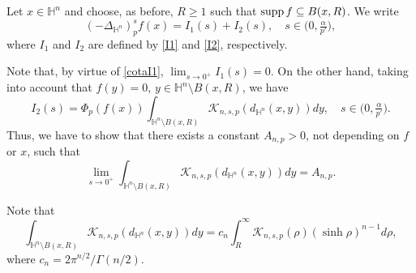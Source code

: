 \documentclass[a4paper,10pt, reqno]{amsart}
\theoremstyle{definition}
\theoremstyle{remark}
\numberwithin{equation}{section}
\begin{document}
{Let $x\in \mathbb H^n$ and choose, as before, $R\geq 1$ such that ${\rm supp }\,f\subseteq B(x,R)$. We write 
$$
(-\Delta_{\mathbb H^n})_p^sf(x)=I_1(s)+I_2(s), \quad s\in \big(0,\tfrac{\alpha}{p'}\big),
$$
where $I_1$ and $I_2$ are defined by \eqref{I1} and \eqref{I2}, respectively.

Note that, by virtue of \eqref{cotaI1}, $\lim_{s\rightarrow 0^+}I_1(s)=0$. On the other hand, taking into account that $f(y)=0$, $y\in \mathbb H^n\setminus B(x,R)$, we have  
\begin{equation}\label{I2b}
I_2(s)=\Phi _p(f(x))\int_{\mathbb H^n\setminus B(x,R)}\mathcal K_{n,s,p}(d_{\mathbb H^n}(x,y))dy,\quad s\in \big(0,\tfrac{\alpha }{p'}\big). 
\end{equation}
Thus, we have to show that there exists a constant $A_{n,p}>0$, not depending on $f$ or $x$, such that 
\begin{equation}\label{Anp}
    \lim_{s\rightarrow 0^+}\int_{\mathbb H^n\setminus B(x,R)}\mathcal K_{n,s,p}(d_{\mathbb H ^n}(x,y))dy=A_{n,p}.
\end{equation}


Note that
$$
\int_{\mathbb H^n\setminus B(x,R)}\mathcal K_{n,s,p}(d_{\mathbb H^n}(x,y))dy=c_n\int_R^\infty \mathcal K_{n,s,p}(\rho)(\sinh \rho )^{n-1}d\rho,
$$
where $c_n=2\pi^{n/2}/\Gamma (n/2)$. 


}
\end{document}
